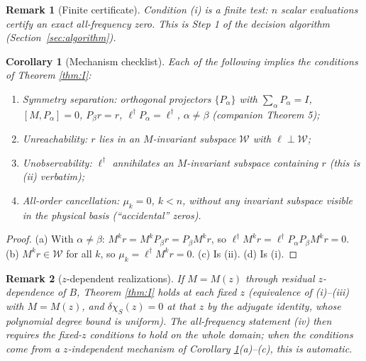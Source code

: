 \documentclass[11pt]{article}
\newtheorem{corollary}{Corollary}
\newtheorem{remark}{Remark}
\begin{document}
\begin{remark}[Finite certificate]
Condition (i) is a \emph{finite} test: $n$ scalar evaluations certify an exact
all-frequency zero. This is Step 1 of the decision algorithm
(Section~\ref{sec:algorithm}).
\end{remark}

\begin{corollary}[Mechanism checklist]
\label{cor:mechanisms}
Each of the following implies the conditions of Theorem \ref{thm:I}:
\begin{enumerate}[label=(\alph*),nosep]
\item \emph{Symmetry separation}: orthogonal projectors $\{P_\alpha\}$ with
      $\sum_\alpha P_\alpha=I$, $[M,P_\alpha]=0$, $P_\beta r=r$,
      $\ell^\dagger P_\alpha=\ell^\dagger$, $\alpha\ne\beta$
      (companion Theorem 5);
\item \emph{Unreachability}: $r$ lies in an $M$-invariant subspace $\mathcal W$
      with $\ell\perp\mathcal W$;
\item \emph{Unobservability}: $\ell^\dagger$ annihilates an $M$-invariant
      subspace containing $r$ (this is (ii) verbatim);
\item \emph{All-order cancellation}: $\mu_k=0$, $k<n$, without any invariant
      subspace visible in the physical basis (``accidental'' zeros).
\end{enumerate}
\end{corollary}

\begin{proof}
(a) With $\alpha\neq\beta$: $M^kr=M^kP_\beta r=P_\beta M^kr$, so
$\ell^\dagger M^kr=\ell^\dagger P_\alpha P_\beta M^kr=0$.
(b) $M^kr\in\mathcal W$ for all $k$, so $\mu_k=\ell^\dagger M^kr=0$.
(c) Is (ii). (d) Is (i). \end{proof}

\begin{remark}[$z$-dependent realizations]
\label{rem:zdep}
If $M=M(z)$ through residual $z$-dependence of $B$, Theorem \ref{thm:I}
holds at each fixed $z$ (equivalence of (i)--(iii) with $M=M(z)$, and
$\delta\chi_S(z)=0$ at that $z$ by the adjugate identity, whose polynomial
degree bound is uniform). The all-frequency statement (iv) then requires the
fixed-$z$ conditions to hold on the whole domain; when the conditions come
from a $z$-independent mechanism of Corollary \ref{cor:mechanisms}(a)--(c),
this is automatic.
\end{remark}

\end{document}
